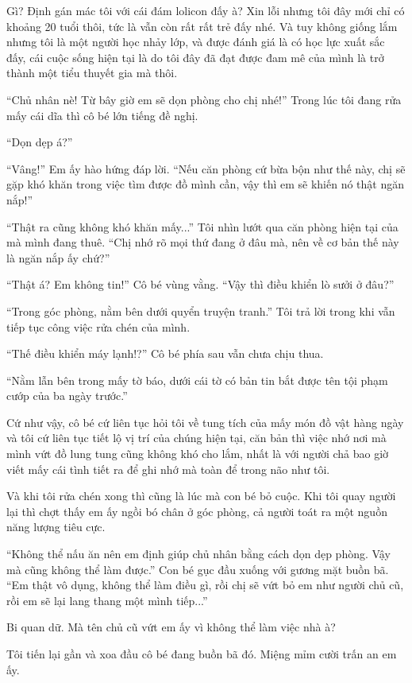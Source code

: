 {Gì? Định gán mác tôi với cái đám lolicon đấy à? Xin lỗi nhưng tôi đây
mới chỉ có khoảng 20 tuổi thôi, tức là vẫn còn rất rất trẻ đấy nhé. Và
tuy không giống lắm nhưng tôi là một người học nhảy lớp, và được đánh
giá là có học lực xuất sắc đấy, cái cuộc sống hiện tại là do tôi đây đã
đạt được đam mê của mình là trở thành một tiểu thuyết gia mà thôi.

``Chủ nhân nè! Từ bây giờ em sẽ dọn phòng cho chị nhé!'' Trong lúc tôi
đang rửa mấy cái dĩa thì cô bé lớn tiếng đề nghị.

``Dọn dẹp á?''

``Vâng!'' Em ấy hào hứng đáp lời. ``Nếu căn phòng cứ bừa bộn như thế
này, chị sẽ gặp khó khăn trong việc tìm được đồ mình cần, vậy thì em sẽ
khiến nó thật ngăn nắp!''

``Thật ra cũng không khó khăn mấy...'' Tôi nhìn lướt qua căn phòng hiện
tại của mà mình đang thuê. ``Chị nhớ rõ mọi thứ đang ở đâu mà, nên về cơ
bản thế này là ngăn nắp ấy chứ?''

``Thật á? Em không tin!'' Cô bé vùng vằng. ``Vậy thì điều khiển lò sưởi
ở đâu?''

``Trong góc phòng, nằm bên dưới quyển truyện tranh.'' Tôi trả lời trong
khi vẫn tiếp tục công việc rửa chén của mình.

``Thế điều khiển máy lạnh!?'' Cô bé phía sau vẫn chưa chịu thua.

``Nằm lẫn bên trong mấy tờ báo, dưới cái tờ có bản tin bắt được tên tội
phạm cướp của ba ngày trước.''

Cứ như vậy, cô bé cứ liên tục hỏi tôi về tung tích của mấy món đồ vật
hàng ngày và tôi cứ liên tục tiết lộ vị trí của chúng hiện tại, căn bản
thì việc nhớ nơi mà mình vứt đồ lung tung cũng không khó cho lắm, nhất
là với người chả bao giờ viết mấy cái tình tiết ra để ghi nhớ mà toàn để
trong não như tôi.

Và khi tôi rửa chén xong thì cũng là lúc mà con bé bỏ cuộc. Khi tôi quay
người lại thì chợt thấy em ấy ngồi bó chân ở góc phòng, cả người toát ra
một nguồn năng lượng tiêu cực.

``Không thể nấu ăn nên em định giúp chủ nhân bằng cách dọn dẹp phòng.
Vậy mà cũng không thể làm được.'' Con bé gục đầu xuống với gương mặt
buồn bã. ``Em thật vô dụng, không thể làm điều gì, rồi chị sẽ vứt bỏ em
như người chủ cũ, rồi em sẽ lại lang thang một mình tiếp...''

Bi quan dữ. Mà tên chủ cũ vứt em ấy vì không thể làm việc nhà à?

Tôi tiến lại gần và xoa đầu cô bé đang buồn bã đó. Miệng mỉm cười trấn
an em ấy.

}
